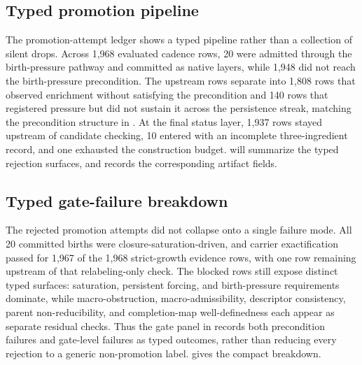 \documentclass{article}
\theoremstyle{definition}
\begin{document}
\subsection{Typed promotion pipeline}\label{subsec:promotion-pipeline}

The promotion-attempt ledger shows a typed pipeline rather than a collection of silent drops. Across 1,968 evaluated cadence rows, 20 were admitted through the birth-pressure pathway and committed as native layers, while 1,948 did not reach the birth-pressure precondition. The upstream rows separate into 1,808 rows that observed enrichment without satisfying the precondition and 140 rows that registered pressure but did not sustain it across the persistence streak, matching the precondition structure in . At the final status layer, 1,937 rows stayed upstream of candidate checking, 10 entered with an incomplete three-ingredient record, and one exhausted the construction budget.  will summarize the typed rejection surfaces, and  records the corresponding artifact fields.

\subsection{Typed gate-failure breakdown}\label{subsec:gate-breakdown}

The rejected promotion attempts did not collapse onto a single failure mode. All 20 committed births were closure-saturation-driven, and carrier exactification passed for 1,967 of the 1,968 strict-growth evidence rows, with one row remaining upstream of that relabeling-only check. The blocked rows still expose distinct typed surfaces: saturation, persistent forcing, and birth-pressure requirements dominate, while macro-obstruction, macro-admissibility, descriptor consistency, parent non-reducibility, and completion-map well-definedness each appear as separate residual checks. Thus the gate panel in  records both precondition failures and gate-level failures as typed outcomes, rather than reducing every rejection to a generic non-promotion label.  gives the compact breakdown.
\end{document}
